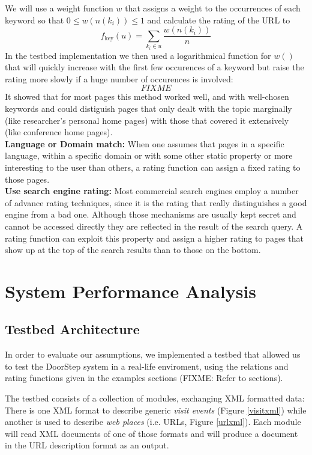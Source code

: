 \documentclass[a4paper]{danarticle}
\theoremstyle{remark}
\begin{document}
    We will use a weight function $ w $ that assigns a weight to the occurrences
    of each keyword so that $ 0 \leq w(n(k_i)) \leq 1 $ and calculate the
    rating of the URL to
    \[
      f_{\mbox{key}}(u) = \sum_{k_i \in u} \frac{w(n(k_i))}{n}
    \]
    In the testbed implementation we then used a logarithmical function for 
    $w()$ that will quickly increase with the first few occurences of a 
    keyword but raise the rating more slowly if a huge number of occurences is 
    involved:
    \[
      FIXME
    \]
    It showed that for most pages this method worked well, and with well-chosen 
    keywords and could distiguish pages that only dealt with the topic 
    marginally (like researcher's personal home pages) with those that covered 
    it extensively (like conference home pages).
    \\
    
    \textbf{Language or Domain match:} When one assumes that pages in a specific 
    language, within a specific domain or with some other static property or 
    more interesting to the user than others, a rating function can assign a 
    fixed rating to those pages.
    \\
    
    \textbf{Use search engine rating:} Most commercial search engines employ a 
    number of advance rating techniques, since it is the rating that really 
    distinguishes a good engine from a bad one. Although those mechanisms are 
    usually kept secret and cannot be accessed directly they are reflected in 
    the result of the search query. A rating function can exploit this property 
    and assign a higher rating to pages that show up at the top of the search 
    results than to those on the bottom.
  \section{System Performance Analysis}
    \subsection{Testbed Architecture}
      In order to evaluate our assumptions, we implemented a testbed that 
      allowed us to test the DoorStep system in a real-life enviroment, using 
      the relations and rating functions given in the examples sections (FIXME: 
      Refer to sections).
      
      The testbed consists of a collection of modules, exchanging XML formatted 
      data: There is one XML format to describe generic \textit{visit events} 
      (Figure \ref{visitxml}) while another is used to describe \textit{web 
      places} (i.e. URLs, Figure \ref{urlxml}). Each module will read XML 
      documents of one of those formats and will produce a document in the URL 
      description format as an output.
      
\end{document}
